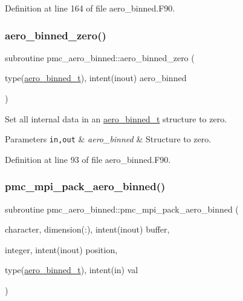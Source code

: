 Definition at line 164 of file aero\+\_\+binned.\+F90.

\mbox{\label{namespacepmc__aero__binned_ab4a6f57e509928736c3e842154a04d76}} 
\subsubsection{\texorpdfstring{aero\+\_\+binned\+\_\+zero()}{aero\_binned\_zero()}}
{\footnotesize\ttfamily subroutine pmc\+\_\+aero\+\_\+binned\+::aero\+\_\+binned\+\_\+zero (\begin{DoxyParamCaption}\item[{type(\mbox{\hyperlink{structpmc__aero__binned_1_1aero__binned__t}{aero\+\_\+binned\+\_\+t}}), intent(inout)}]{aero\+\_\+binned }\end{DoxyParamCaption})}



Set all internal data in an \mbox{\hyperlink{structpmc__aero__binned_1_1aero__binned__t}{aero\+\_\+binned\+\_\+t}} structure to zero. 


\begin{DoxyParams}[1]{Parameters}
\mbox{\tt in,out}  & {\em aero\+\_\+binned} & Structure to zero. \\
\hline
\end{DoxyParams}


Definition at line 93 of file aero\+\_\+binned.\+F90.

\mbox{\label{namespacepmc__aero__binned_a9c4ceab5200a5fafdc12aba7197b2b6c}} 
\subsubsection{\texorpdfstring{pmc\+\_\+mpi\+\_\+pack\+\_\+aero\+\_\+binned()}{pmc\_mpi\_pack\_aero\_binned()}}
{\footnotesize\ttfamily subroutine pmc\+\_\+aero\+\_\+binned\+::pmc\+\_\+mpi\+\_\+pack\+\_\+aero\+\_\+binned (\begin{DoxyParamCaption}\item[{character, dimension(\+:), intent(inout)}]{buffer,  }\item[{integer, intent(inout)}]{position,  }\item[{type(\mbox{\hyperlink{structpmc__aero__binned_1_1aero__binned__t}{aero\+\_\+binned\+\_\+t}}), intent(in)}]{val }\end{DoxyParamCaption})}



